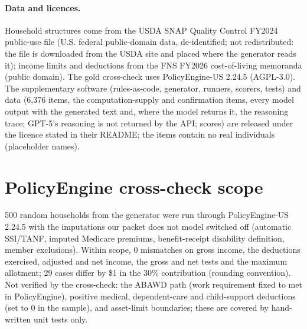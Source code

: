 \documentclass[11pt]{article}
\begin{document}
\paragraph{Data and licences.} Household structures come from the USDA SNAP Quality Control FY2024 public-use file (U.S. federal public-domain data, de-identified; not redistributed: the file is downloaded from the USDA site and placed where the generator reads it); income limits and deductions from the FNS FY2026 cost-of-living memoranda (public domain). The gold cross-check uses PolicyEngine-US 2.24.5 (AGPL-3.0). The supplementary software (rules-as-code, generator, runners, scorers, tests) and data (6,376 items, the computation-supply and confirmation items, every model output with the generated text and, where the model returns it, the reasoning trace; GPT-5's reasoning is not returned by the API; scores) are released under the licence stated in their README; the items contain no real individuals (placeholder names).

\section{PolicyEngine cross-check scope}\label{app:pe}
500 random households from the generator were run through PolicyEngine-US 2.24.5 with the imputations our packet does not model switched off (automatic SSI/TANF, imputed Medicare premiums, benefit-receipt disability definition, member exclusions). Within scope, 0 mismatches on gross income, the deductions exercised, adjusted and net income, the gross and net tests and the maximum allotment; 29 cases differ by \$1 in the 30\% contribution (rounding convention). Not verified by the cross-check: the ABAWD path (work requirement fixed to met in PolicyEngine), positive medical, dependent-care and child-support deductions (set to 0 in the sample), and asset-limit boundaries; these are covered by hand-written unit tests only.
\end{document}
